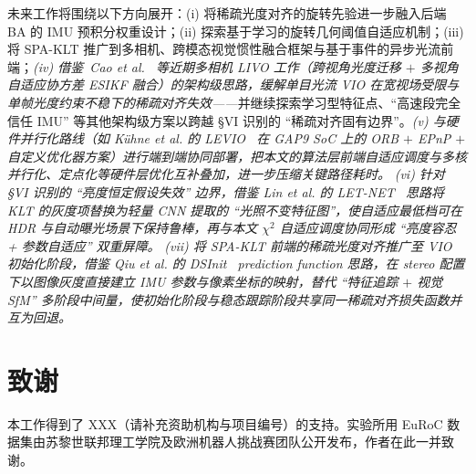 \documentclass[letterpaper,journal]{IEEEtran}
\begin{document}
未来工作将围绕以下方向展开：(i) 将稀疏光度对齐的旋转先验进一步融入后端 BA 的 IMU 预积分权重设计；(ii) 探索基于学习的旋转几何阈值自适应机制；(iii) 将 SPA-KLT 推广到多相机、跨模态视觉惯性融合框架与基于事件的异步光流前端；\textit{(iv) 借鉴~Cao \emph{et al.}~\cite{cao2026omnilivo} 等近期多相机 LIVO 工作（跨视角光度迁移 $+$ 多视角自适应协方差 ESIKF 融合）的架构级思路，缓解单目光流 VIO 在宽视场受限与单帧光度约束不稳下的稀疏对齐失效——}并继续探索学习型特征点、``高速段完全信任 IMU'' 等其他架构级方案以跨越 §VI 识别的 ``稀疏对齐固有边界''。\textit{(v) 与硬件并行化路线（如 K\"uhne \emph{et al.} 的 LEVIO~\cite{kuhne2026levio} 在 GAP9 SoC 上的 ORB $+$ EPnP $+$ 自定义优化器方案）进行端到端协同部署，把本文的算法层前端自适应调度与多核并行化、定点化等硬件层优化互补叠加，进一步压缩关键路径耗时。} \textit{(vi) 针对 §VI 识别的 ``亮度恒定假设失效'' 边界，借鉴 Lin \emph{et al.} 的 LET-NET~\cite{lin2024letnet} 思路将 KLT 的灰度项替换为轻量 CNN 提取的 ``光照不变特征图''，使自适应最低档可在 HDR 与自动曝光场景下保持鲁棒，再与本文 $\chi^2$ 自适应调度协同形成 ``亮度容忍 + 参数自适应'' 双重屏障。} \textit{(vii) 将 SPA-KLT 前端的稀疏光度对齐推广至 VIO 初始化阶段，借鉴 Qiu \emph{et al.} 的 DSInit~\cite{qiu2026dsinit} prediction function 思路，在 stereo 配置下以图像灰度直接建立 IMU 参数与像素坐标的映射，替代 ``特征追踪 $+$ 视觉 SfM'' 多阶段中间量，使初始化阶段与稳态跟踪阶段共享同一稀疏对齐损失函数并互为回退。}

\section*{致谢}
本工作得到了 XXX（请补充资助机构与项目编号）的支持。实验所用 EuRoC 数据集由苏黎世联邦理工学院及欧洲机器人挑战赛团队公开发布，作者在此一并致谢。
\end{document}
